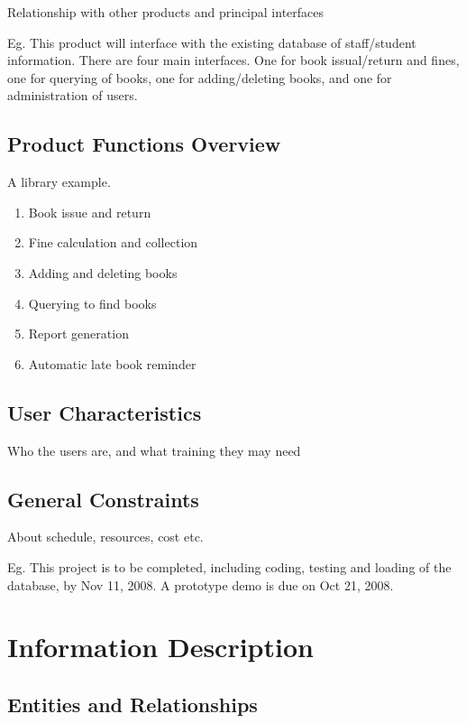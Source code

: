 \documentclass[a4wide]{article}
\begin{document}
Relationship with other products and principal interfaces

Eg.  This product will interface with the existing database of staff/student
information.  There are four main interfaces.  One for book issual/return
and fines, one for querying of books, one for adding/deleting books, 
and one for administration of users.

\subsection{Product Functions Overview}

A library example.
\begin{enumerate}
\item Book issue and return
\item Fine calculation and collection
\item Adding and deleting books 
\item Querying to find books
\item Report generation 
\item Automatic late book reminder
\end{enumerate} 

\subsection{User Characteristics}

Who the users are, and what training they may need

\subsection{General Constraints}

About schedule, resources, cost etc.

Eg. This project is to be completed, including coding, testing and loading of
the database, by Nov 11, 2008.  A prototype demo is due on Oct 21, 2008.


\section{Information Description}

\subsection{Entities and Relationships}
\end{document}
